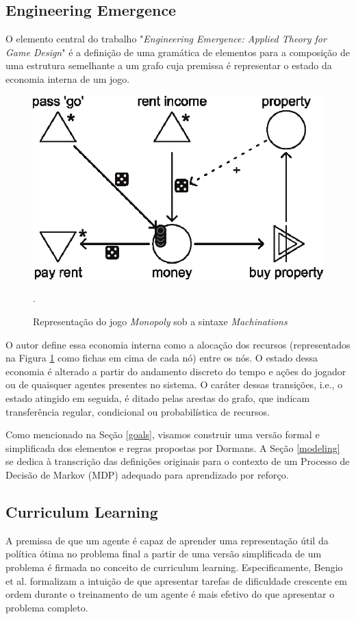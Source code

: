 \documentclass[conference]{IEEEtran}
\begin{document}
\subsection{Engineering Emergence}
\label{references:machinations}
O elemento central do trabalho "\textit{Engineering Emergence: Applied Theory for Game Design}"\cite{machinations} é a definição de uma gramática de elementos para a composição de uma estrutura semelhante a um grafo cuja premissa é representar o estado da economia interna de um jogo.
\begin{figure}[h!]
    \centering
    \includegraphics[width=0.9\linewidth]{figures/monopoly.png}
    \caption{Representação do jogo \textit{Monopoly} sob a sintaxe \textit{Machinations}}.
    \label{fig:monopoly}
\end{figure}

O autor define essa economia interna como a alocação dos recursos (representados na Figura \ref{fig:monopoly} como fichas em cima de cada nó) entre os nós. O estado dessa economia é alterado a partir do andamento discreto do tempo e ações do jogador ou de quaisquer agentes presentes no sistema. O caráter dessas transições, i.e., o estado atingido em seguida, é ditado pelas arestas do grafo, que indicam transferência regular, condicional ou probabilística de recursos.

Como mencionado na Seção \ref{goals}, visamos construir uma versão formal e simplificada dos elementos e regras propostas por Dormans. A Seção \ref{modeling} se dedica à transcrição das definições originais para o contexto de um Processo de Decisão de Markov (MDP) adequado para aprendizado por reforço.

\subsection{Curriculum Learning}
A premissa de que um agente é capaz de aprender uma representação útil da política ótima no problema final a partir de uma versão simplificada de um problema é firmada no conceito de curriculum learning. Especificamente, Bengio et al.\cite{curriculum} formalizam a intuição de que apresentar tarefas de dificuldade crescente em ordem durante o treinamento de um agente é mais efetivo do que apresentar o problema completo.
\end{document}
